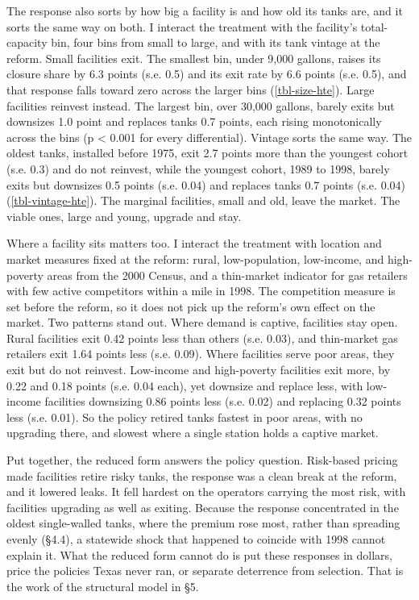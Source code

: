 \documentclass[
  12pt,
]{article}
\begin{document}
The response also sorts by how big a facility is and how old its tanks
are, and it sorts the same way on both. I interact the treatment with
the facility's total-capacity bin, four bins from small to large, and
with its tank vintage at the reform. Small facilities exit. The smallest
bin, under 9,000 gallons, raises its closure share by 6.3 points (s.e.
0.5) and its exit rate by 6.6 points (s.e. 0.5), and that response falls
toward zero across the larger bins (\autoref{tbl-size-hte}). Large
facilities reinvest instead. The largest bin, over 30,000 gallons,
barely exits but downsizes 1.0 point and replaces tanks 0.7 points, each
rising monotonically across the bins (p \textless{} 0.001 for every
differential). Vintage sorts the same way. The oldest tanks, installed
before 1975, exit 2.7 points more than the youngest cohort (s.e. 0.3)
and do not reinvest, while the youngest cohort, 1989 to 1998, barely
exits but downsizes 0.5 points (s.e. 0.04) and replaces tanks 0.7 points
(s.e. 0.04) (\autoref{tbl-vintage-hte}). The marginal facilities, small
and old, leave the market. The viable ones, large and young, upgrade and
stay.

Where a facility sits matters too. I interact the treatment with
location and market measures fixed at the reform: rural, low-population,
low-income, and high-poverty areas from the 2000 Census, and a
thin-market indicator for gas retailers with few active competitors
within a mile in 1998. The competition measure is set before the reform,
so it does not pick up the reform's own effect on the market. Two
patterns stand out. Where demand is captive, facilities stay open. Rural
facilities exit 0.42 points less than others (s.e. 0.03), and
thin-market gas retailers exit 1.64 points less (s.e. 0.09). Where
facilities serve poor areas, they exit but do not reinvest. Low-income
and high-poverty facilities exit more, by 0.22 and 0.18 points (s.e.
0.04 each), yet downsize and replace less, with low-income facilities
downsizing 0.86 points less (s.e. 0.02) and replacing 0.32 points less
(s.e. 0.01). So the policy retired tanks fastest in poor areas, with no
upgrading there, and slowest where a single station holds a captive
market.

Put together, the reduced form answers the policy question. Risk-based
pricing made facilities retire risky tanks, the response was a clean
break at the reform, and it lowered leaks. It fell hardest on the
operators carrying the most risk, with facilities upgrading as well as
exiting. Because the response concentrated in the oldest single-walled
tanks, where the premium rose most, rather than spreading evenly (§4.4),
a statewide shock that happened to coincide with 1998 cannot explain it.
What the reduced form cannot do is put these responses in dollars, price
the policies Texas never ran, or separate deterrence from selection.
That is the work of the structural model in §5.
\end{document}
